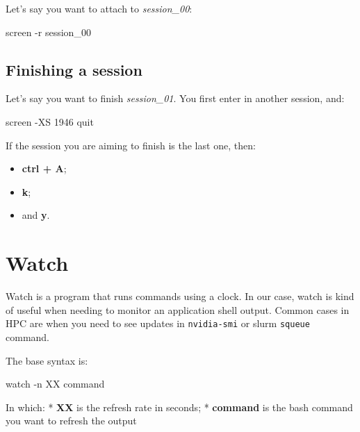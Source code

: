 \documentclass[
]{book}
\newenvironment{Shaded}{\begin{snugshade}}{\end{snugshade}}
\newcommand{\AttributeTok}[1]{\textcolor[rgb]{0.77,0.63,0.00}{#1}}
\newcommand{\ExtensionTok}[1]{#1}
\newcommand{\NormalTok}[1]{#1}
\providecommand{\tightlist}{%
  \setlength{\itemsep}{0pt}\setlength{\parskip}{0pt}}
\begin{document}
Let's say you want to attach to \emph{session\_00}:

\begin{Shaded}
\begin{Highlighting}[]
\ExtensionTok{screen} \AttributeTok{{-}r}\NormalTok{ session\_00}
\end{Highlighting}
\end{Shaded}

\hypertarget{finishing-a-session}{%
\subsection{Finishing a session}\label{finishing-a-session}}

Let's say you want to finish \emph{session\_01}. You first enter in another session, and:

\begin{Shaded}
\begin{Highlighting}[]
\ExtensionTok{screen} \AttributeTok{{-}XS}\NormalTok{ 1946 quit}
\end{Highlighting}
\end{Shaded}

If the session you are aiming to finish is the last one, then:

\begin{itemize}
\tightlist
\item
  \textbf{ctrl + A};
\item
  \textbf{k};
\item
  and \textbf{y}.
\end{itemize}

\hypertarget{watch}{%
\section{Watch}\label{watch}}

Watch is a program that runs commands using a clock. In our case, watch is kind
of useful when needing to monitor an application shell output. Common cases in HPC
are when you need to see updates in \texttt{nvidia-smi} or slurm \texttt{squeue} command.

The base syntax is:

\begin{Shaded}
\begin{Highlighting}[]
\ExtensionTok{watch} \AttributeTok{{-}n}\NormalTok{ XX command}
\end{Highlighting}
\end{Shaded}

In which:
* \textbf{XX} is the refresh rate in seconds;
* \textbf{command} is the bash command you want to refresh the output
\end{document}
